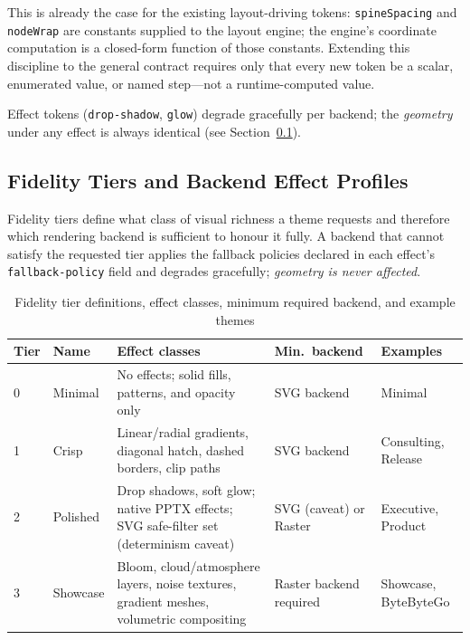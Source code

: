 This is already the case for the existing layout-driving tokens: \texttt{spineSpacing} and
\texttt{nodeWrap} are constants supplied to the layout engine; the engine's coordinate
computation is a closed-form function of those constants. Extending this discipline to the
general contract requires only that every new token be a scalar, enumerated value, or
named step---not a runtime-computed value.

Effect tokens (\texttt{drop-shadow}, \texttt{glow}) degrade gracefully per backend; the
\emph{geometry} under any effect is always identical (see Section~\ref{sec:fidelity-tiers}).

\subsection{Fidelity Tiers and Backend Effect Profiles}
\label{sec:fidelity-tiers}

Fidelity tiers define what class of visual richness a theme requests and therefore which
rendering backend is sufficient to honour it fully. A backend that cannot satisfy the
requested tier applies the fallback policies declared in each effect's
\texttt{fallback-policy} field and degrades gracefully; \emph{geometry is never affected}.

\begin{table}[h]
\centering
\small
\begin{tabularx}{\textwidth}{lXXXX}
\toprule
\textbf{Tier} & \textbf{Name} & \textbf{Effect classes} & \textbf{Min.\ backend} & \textbf{Examples} \\
\midrule
0 & Minimal &
  No effects; solid fills, patterns, and opacity only &
  SVG backend &
  Minimal \\[4pt]
1 & Crisp &
  Linear/radial gradients, diagonal hatch, dashed borders, clip paths &
  SVG backend &
  Consulting, Release \\[4pt]
2 & Polished &
  Drop shadows, soft glow; native PPTX effects; SVG safe-filter set (determinism caveat) &
  SVG (caveat) or Raster &
  Executive, Product \\[4pt]
3 & Showcase &
  Bloom, cloud/atmosphere layers, noise textures, gradient meshes, volumetric compositing &
  Raster backend required &
  Showcase, ByteByteGo \\
\bottomrule
\end{tabularx}
\caption{Fidelity tier definitions, effect classes, minimum required backend, and example themes}
\label{tab:fidelity-tiers}
\end{table}

